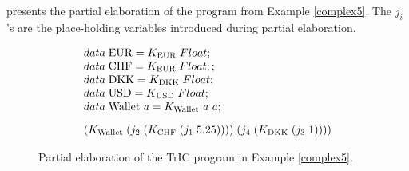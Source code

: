 
 presents the partial elaboration of the program from Example \ref{complex5}. The $j_i$'s are the place-holding variables introduced during partial elaboration.

\begin{figure}
     \[
\begin{array}{@{\hspace{0mm}}l@{\hspace{0mm}}}
  data\;\text{EUR}=K_{\text{EUR}}\;Float;\\
  data\;\text{CHF}=K_{\text{EUR}}\;Float;;\\
  data\;\text{DKK}=K_{\text{DKK}}\;Float;\\
  data\;\text{USD}=K_{\text{USD}}\;Float;\\
  data\;\text{Wallet}\;\tyVar=K_{\text{Wallet}}\; \tyVar \; \tyVar;\\[3mm]
  (K_{\text{Wallet}}\;(j_2\;(K_{\text{CHF}}\;(j_1\; 5.25))))\;(j_4\; (K_{\text{DKK}}\;(j_3\;1)))) 

\end{array}
\]
\caption{Partial elaboration of the TrIC program in Example \ref{complex5}.}
\label{partialElab}
\end{figure}



